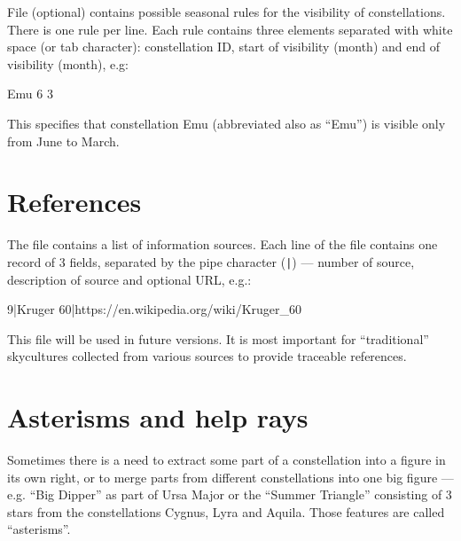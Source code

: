 File  (optional) contains possible seasonal rules for
the visibility of constellations. There is one rule per line. Each
rule contains three elements separated with white space (or tab
character): constellation ID, start of visibility (month) and end of
visibility (month), e.g:

\begin{configfile}
  Emu 6 3
\end{configfile}

\noindent This specifies that constellation Emu (abbreviated also as ``Emu'') is
visible only from June to March.

\section{References}
\label{sec:skycultures:references}

\noindent{}The file  contains a list of information sources. 
Each line of the file contains one record of 3 fields,
separated by the pipe character (\texttt{|}) --- number of source, 
description of source and optional URL, e.g.:

\begin{configfile}
9|Kruger 60|https://en.wikipedia.org/wiki/Kruger_60
\end{configfile}

This file will be used in future versions. It is most important for ``traditional'' 
skycultures collected from various sources to provide traceable references. 

\section{Asterisms and help rays}
\label{sec:skycultures:asterisms}

\noindent{}Sometimes there is a need to extract some part of a 
constellation into a figure in its own right, or to merge parts from different 
constellations into one big figure --- e.g. ``Big Dipper'' as part of Ursa Major or the 
``Summer Triangle'' consisting of 3 stars from the constellations Cygnus, Lyra and Aquila. 
Those features are called ``asterisms''. 


